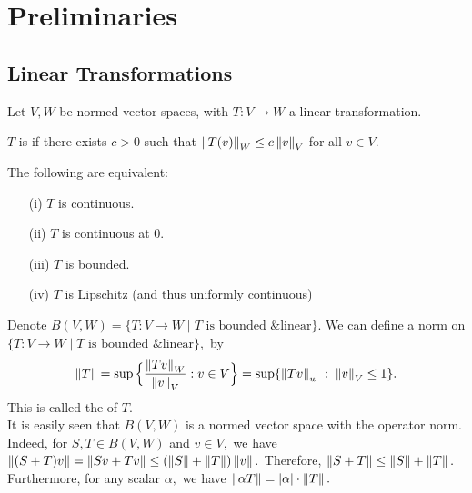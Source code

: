 \chapter{Preliminaries}

\section{Linear Transformations}

Let $V,W$ be normed vector spaces, with $T:V\rightarrow W$ a linear transformation.

\begin{defn}
$T$ is  if there exists $c>0$ such that $\left\lVert T(v)\right\rVert_W\leq c\left\lVert v\right\rVert_V$ for all $v\in V.$
\end{defn}

\begin{thm}
The following are equivalent:
\begin{enumerate}
\item[(i)] $T$ is continuous.
\item[(ii)] $T$ is continuous at $0.$
\item[(iii)] $T$ is bounded.
\item[(iv)] $T$ is Lipschitz (and thus uniformly continuous)
\end{enumerate}
\end{thm}

Denote $B(V,W)=\{T:V\rightarrow W\;|\;T\text{ is bounded \& linear}\}.$
We can define a norm on $\{T:V\rightarrow W\;|\;T\text{ is bounded \& linear}\},$ by
$$\left\lVert T\right\rVert=\sup\Big\{\frac{\left\lVert Tv\right\rVert_W}{\left\lVert v\right\rVert_V}:v\in V\Big\}=\sup\{\left\lVert Tv\right\rVert_w\;:\;\left\lVert v\right\rVert_V\leq 1\}.$$
This is called the  of $T.$\\

It is easily seen that $B(V,W)$ is a normed vector space with the operator norm. Indeed, for $S,T\in B(V,W)$ and $v\in V,$ we have $\left\lVert(S+T)v\right\rVert=\left\lVert Sv+Tv\right\rVert\leq(\left\lVert S\right\rVert+\left\lVert T\right\rVert)\left\lVert v\right\rVert.$ Therefore, $\left\lVert S+T\right\rVert\leq\left\lVert S\right\rVert+\left\lVert T\right\rVert.$ Furthermore, for any scalar $\alpha,$ we have $\left\lVert\alpha T\right\rVert=|\alpha|\cdot\left\lVert T\right\rVert.$ \\

